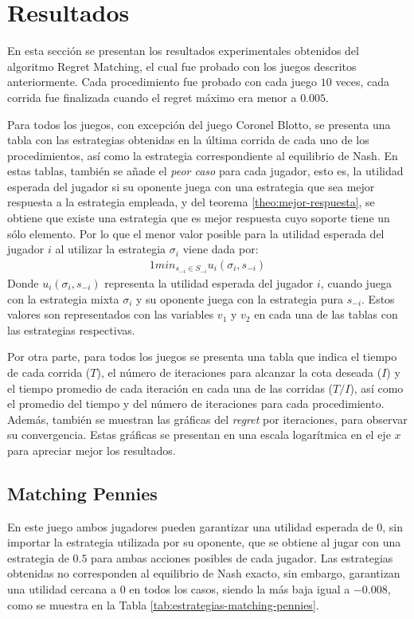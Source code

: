 \section{Resultados}
En esta sección se presentan los resultados experimentales obtenidos del algoritmo Regret Matching, el cual fue probado con los juegos descritos anteriormente. Cada procedimiento fue probado con cada juego $10$ veces, cada corrida fue finalizada cuando el regret máximo era menor a $0.005$.

Para todos los juegos, con excepción del juego Coronel Blotto, se presenta una tabla con las estrategias obtenidas en la última corrida de cada uno de los procedimientos, así como la estrategia correspondiente al equilibrio de Nash. En estas tablas, también se añade el \textit{peor caso} para cada jugador, esto es, la utilidad esperada del jugador si su oponente juega con una estrategia que sea mejor respuesta a la estrategia empleada, y del teorema \ref{theo:mejor-respuesta}, se obtiene que existe una estrategia que es mejor respuesta cuyo soporte tiene un sólo elemento. Por lo que el menor valor posible para la utilidad esperada del jugador $i$ al utilizar la estrategia $\sigma_i$ viene dada por:
\begin{alignat}{1}
min_{s_{-i} \in S_{-i}} u_i(\sigma_i, s_{-i})
\end{alignat}
Donde $u_i(\sigma_i, s_{-i})$ representa la utilidad esperada del jugador $i$, cuando juega con la estrategia mixta $\sigma_i$ y su oponente juega con la estrategia pura $s_{-i}$. Estos valores son representados con las variables $v_1$ y $v_2$ en cada una de las tablas con las estrategias respectivas.

Por otra parte, para todos los juegos se presenta una tabla que indica el tiempo de cada corrida ($T$), el número de iteraciones para alcanzar la cota deseada ($I$) y el tiempo promedio de cada iteración en cada una de las corridas ($T/I$), así como el promedio del tiempo y del número de iteraciones para cada procedimiento. Además, también se muestran las gráficas del \textit{regret} por iteraciones, para observar su convergencia. Estas gráficas se presentan en una escala logarítmica en el eje $x$ para apreciar mejor los resultados.

\subsection{Matching Pennies}
En este juego ambos jugadores pueden garantizar una utilidad esperada de $0$, sin importar la estrategia utilizada por su oponente, que se obtiene al jugar con una estrategia de $0.5$ para ambas acciones posibles de cada jugador. Las estrategias obtenidas no corresponden al equilibrio de Nash exacto, sin embargo, garantizan una utilidad cercana a $0$ en todos los casos, siendo la más baja igual a $-0.008$, como se muestra en la Tabla \ref{tab:estrategias-matching-pennies}.


